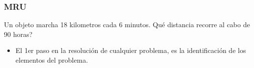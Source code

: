 \documentclass{beamer}
\begin{document}
\begin{frame}
\frametitle{MRU}
% 
Un {{ objeto }} marcha 18 kilometros cada 6 minutos. 
Qu\'e {{ distancia }} recorre al cabo de {{ 90 horas? }} %

\begin{itemize}
\item El 1er paso en la resoluci\'on de cualquier problema, es la
identificaci\'on de los elementos del problema.
\end{itemize}



\end{frame}
\end{document}
